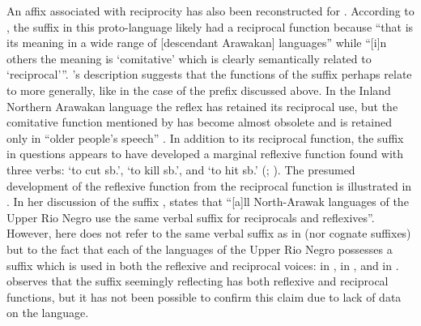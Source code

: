 An affix associated with reciprocity has also been reconstructed for . According to \cite[109f.]{wise:1990}, the suffix  in this proto-language likely had a reciprocal function because “that is its meaning in a wide range of [descendant Arawakan] languages” while “[i]n others the meaning is ‘comitative’ which is clearly semantically related to ‘reciprocal’”. \citeauthor{wise:1990}’s description suggests that the functions of the  suffix  perhaps relate to  more generally, like in the case of the  prefix  discussed above. In the Inland Northern Arawakan language  the reflex  has retained its reciprocal use, but the comitative function mentioned by \citeauthor{wise:1990} has become almost obsolete and is retained only in “older people’s speech” \citep[264]{aikhenvald:2003}. In addition to its reciprocal function, the suffix in questions appears to have developed a marginal reflexive function found with three verbs:  ‘to cut sb.’,  ‘to kill sb.’, and  ‘to hit sb.’ (\citealt[266f.]{aikhenvald:2003}; \citeyear[1357]{aikhenvald:2007b}). The presumed development of the reflexive function from the reciprocal function is illustrated in . In her discussion of the  suffix , \cite[1357]{aikhenvald:2007b} states that “[a]ll North-Arawak languages of the Upper Rio Negro use the same verbal suffix for reciprocals and reflexives”. However, here \cite[847]{aikhenvald:2007b} does not refer to the same verbal suffix as in  (nor cognate suffixes) but to the fact that each of the languages of the Upper Rio Negro possesses a suffix which is used in both the reflexive and reciprocal voices:  in ,  in , and  in . \cite[104]{wise:1990} observes that the  suffix  seemingly reflecting   has both reflexive and reciprocal functions, but it has not been possible to confirm this claim due to lack of data on the language.

